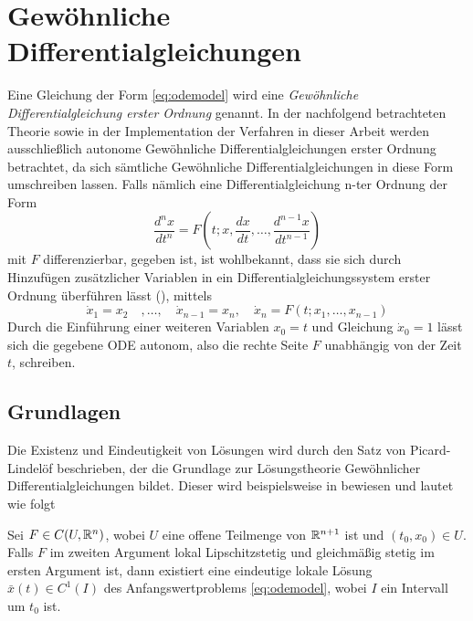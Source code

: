 \section{Gewöhnliche Differentialgleichungen}
Eine Gleichung der Form \eqref{eq:odemodel} wird eine \textit{Gewöhnliche Differentialgleichung erster Ordnung} genannt. 
In der nachfolgend betrachteten Theorie sowie in der Implementation der Verfahren in dieser Arbeit werden ausschließlich autonome Gewöhnliche Differentialgleichungen erster Ordnung betrachtet, da sich sämtliche Gewöhnliche Differentialgleichungen in diese Form umschreiben lassen.
Falls nämlich eine Differentialgleichung n-ter Ordnung der Form 
\[
 \frac{d^n x}{dt^n}= F\left(t;x,\frac{dx}{dt},\ldots,\frac{d^{n-1} x}{dt^{n-1}}\right)
\]
mit $F$ differenzierbar, gegeben ist, ist wohlbekannt, dass sie sich durch Hinzufügen zusätzlicher Variablen in ein Differentialgleichungssystem erster Ordnung überführen lässt (\cite[S. 105]{arnold2001grundbegriffe}), mittels
\[
 \dot x_1 = x_2 \quad ,\ldots,\quad \dot x_{n-1} = x_n, \quad  \dot x_n = F(t;x_1,\ldots,x_{n-1})
\]
Durch die Einführung einer weiteren Variablen $x_0 = t$ und Gleichung $\dot x_0=1$ lässt sich die gegebene ODE autonom, also die rechte Seite $F$ unabhängig von der Zeit $t$, schreiben.
\subsection{Grundlagen}
Die Existenz und Eindeutigkeit von Lösungen wird durch den Satz von Picard-Lindelöf beschrieben, der die Grundlage zur Lösungstheorie Gewöhnlicher Differentialgleichungen bildet. Dieser wird beispielsweise in \cite{teschl2012ordinary} bewiesen und lautet wie folgt 
\begin{theorem}
\label{thm:picard-lindeloeff}
 Sei $F\in C(U,\mathbb{R}^n)$, wobei $U$ eine offene Teilmenge von $\mathbb{R}^{n+1}$ ist und $(t_0,x_0)\in U$. Falls $F$ im zweiten Argument lokal Lipschitzstetig und gleichmäßig stetig im ersten Argument ist, dann existiert eine eindeutige lokale Lösung $\bar x(t)\in C^1(I)$ des Anfangswertproblems \eqref{eq:odemodel}, wobei $I$ ein Intervall um $t_0$ ist.
\end{theorem}
% 

